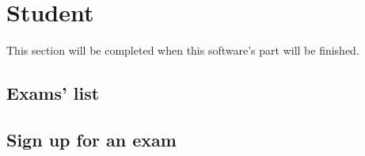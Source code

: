 \documentclass[ManualeUtente]{subfiles}
\begin{document}
\chapter{Student}
This section will be completed when this software's part will be finished.
\section{Exams' list}
\section{Sign up for an exam}
\end{document}
